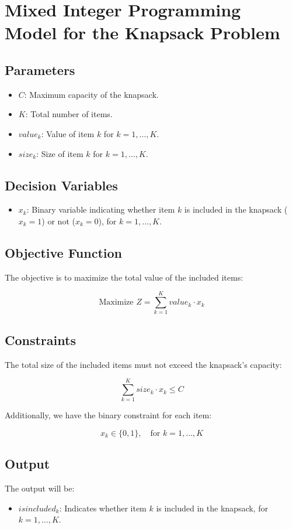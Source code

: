 \documentclass{article}
\begin{document}
\section*{Mixed Integer Programming Model for the Knapsack Problem}

\subsection*{Parameters}
\begin{itemize}
    \item $C$: Maximum capacity of the knapsack.
    \item $K$: Total number of items.
    \item $value_k$: Value of item $k$ for $k = 1, \ldots, K$.
    \item $size_k$: Size of item $k$ for $k = 1, \ldots, K$.
\end{itemize}

\subsection*{Decision Variables}
\begin{itemize}
    \item $x_k$: Binary variable indicating whether item $k$ is included in the knapsack ($x_k = 1$) or not ($x_k = 0$), for $k = 1, \ldots, K$.
\end{itemize}

\subsection*{Objective Function}
The objective is to maximize the total value of the included items:

\begin{equation}
\text{Maximize } Z = \sum_{k=1}^{K} value_k \cdot x_k
\end{equation}

\subsection*{Constraints}
The total size of the included items must not exceed the knapsack's capacity:

\begin{equation}
\sum_{k=1}^{K} size_k \cdot x_k \leq C
\end{equation}

Additionally, we have the binary constraint for each item:

\begin{equation}
x_k \in \{0, 1\}, \quad \text{for } k = 1, \ldots, K
\end{equation}

\subsection*{Output}
The output will be:
\begin{itemize}
    \item $isincluded_k$: Indicates whether item $k$ is included in the knapsack, for $k = 1, \ldots, K$.
\end{itemize}
\end{document}

